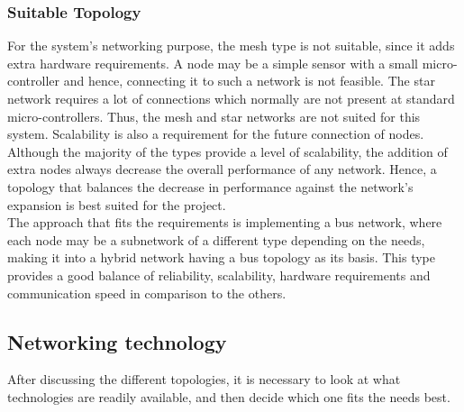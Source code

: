 \subsubsection{Suitable Topology}
For the system's networking purpose, the mesh type is not suitable, since it adds extra hardware requirements.
A node may be a simple sensor with a small micro-controller and hence, connecting it to such a network is not feasible.
The star network requires a lot of connections which normally are not present at standard micro-controllers.
Thus, the mesh and star networks are not suited for this system.
Scalability is also a requirement for the future connection of nodes.
Although the majority of the types provide a level of scalability, the addition of extra nodes always decrease the overall performance of any network.
Hence, a topology that balances the decrease in performance against the network's expansion is best suited for the project.\\

The approach that fits the requirements is implementing a bus network, where each node may be a subnetwork of a different type depending on the needs, making it into a hybrid network having a bus topology as its basis.
This type provides a good balance of reliability, scalability, hardware requirements and communication speed in comparison to the others.
\subsection{Networking technology}
After discussing the different topologies, it is necessary to look at what technologies are readily available, and then decide which one fits the needs best.
